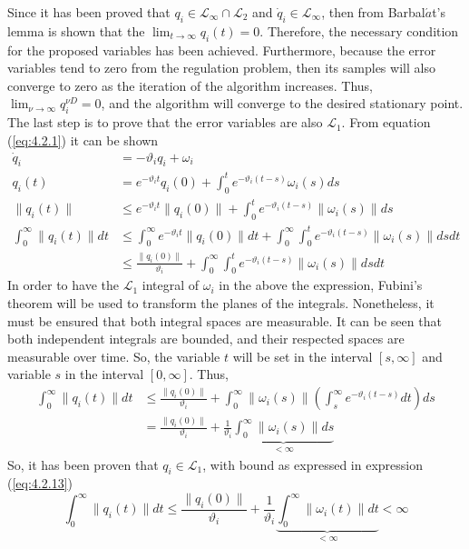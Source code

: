     Since it has been proved that $q_i \in \mathcal{L}_{\infty} \cap \mathcal{L}_2$ and $\dot{q}_i \in \mathcal{L}_{\infty}$, then from Barbal$\acute{a}$t's lemma is shown that the $\lim_{t \to \infty} q_i(t) = 0$. Therefore, the necessary condition for the proposed variables has been achieved. Furthermore, because the error variables tend to zero from the regulation problem, then its samples will also converge to zero as the iteration of the algorithm increases. Thus, $\lim_{\nu \to \infty} q_i^{\nu D} = 0$, and the algorithm will converge to the desired stationary point.
    The last step is to prove that the error variables are also $\mathcal{L}_1$. From equation (\ref{eq:4.2.1}) it can be shown
    \begin{equation*}
        \begin{align}
            \dot{q}_i &= -\vartheta_i q_i + \omega_i\\
            q_i(t) &= e^{-\vartheta_i t}q_i(0) + \int_{0}^{t} e^{-\vartheta_i (t - s)} \omega_i (s) ds\\
            \lVert q_i(t) \rVert & \leq e^{-\vartheta_i t} \lVert q_i(0) \rVert + \int_{0}^{t} e^{-\vartheta_i (t - s)} \lVert \omega_i (s) \rVert ds\\
            \int_{0}^{\infty} \lVert q_i(t) \rVert dt & \leq \int_{0}^{\infty} e^{-\vartheta_i t} \lVert q_i(0) \rVert dt + \int_{0}^{\infty} \int_{0}^{t} e^{-\vartheta_i (t - s)} \lVert \omega_i (s) \rVert ds dt\\
             & \leq \frac{\lVert q_i(0) \rVert}{\vartheta_i} + \int_{0}^{\infty} \int_{0}^{t} e^{-\vartheta_i (t - s)} \lVert \omega_i (s) \rVert ds dt
        \end{align}
    \end{equation*}
    In order to have the $\mathcal{L}_1$ integral of $\omega_i$ in the above the expression, Fubini's theorem will be used to transform the planes of the integrals. Nonetheless, it must be ensured that both integral spaces are measurable. It can be seen that both independent integrals are bounded, and their respected spaces are measurable over time. So, the variable $t$ will be set in the interval $[s, \infty]$ and variable $s$ in the interval $[0, \infty]$. Thus,
    \begin{equation*}
        \begin{align}
            \int_{0}^{\infty} \lVert q_i(t) \rVert dt & \leq  \frac{\lVert q_i(0) \rVert}{\vartheta_i} + \int_{0}^{\infty} \lVert \omega_i (s) \rVert \left( \int_{s}^{\infty} e^{-\vartheta_i (t - s)}dt\right) ds\\
            &= \frac{\lVert q_i(0) \rVert}{\vartheta_i} + \frac{1}{\vartheta_i}\underbrace{\int_{0}^{\infty} \lVert \omega_i (s) \rVert ds}_{<\infty}
        \end{align}
    \end{equation*}
    So, it has been proven that $q_i \in \mathcal{L}_1$, with bound as expressed in expression (\ref{eq:4.2.13})
    \begin{equation}\label{eq:4.2.13}
        \int_{0}^{\infty} \lVert q_i(t) \rVert dt \leq \frac{\lVert q_i(0) \rVert}{\vartheta_i} + \frac{1}{\vartheta_i}\underbrace{\int_{0}^{\infty} \lVert \omega_i (t) \rVert dt}_{<\infty} < \infty
    \end{equation}

